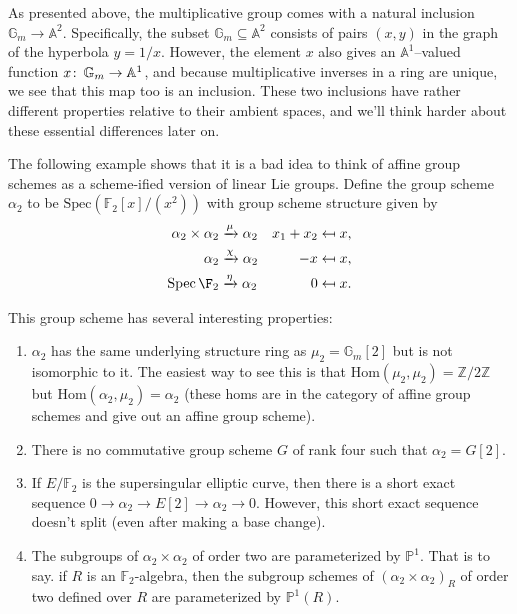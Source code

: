 \begin{remark}
As presented above, the multiplicative group comes with a natural inclusion $\mathbb G_m \to \mathbb A^2$.  Specifically, the subset $\mathbb G_m \subseteq \mathbb A^2$ consists of pairs $(x, y)$ in the graph of the hyperbola $y = 1/x$.  However, the element $x$ also gives an $\mathbb A^1$--valued function $x\colon\thinspace \mathbb G_m \to \mathbb A^1$, and because multiplicative inverses in a ring are unique, we see that this map too is an inclusion.  These two inclusions have rather different properties relative to their ambient spaces, and we'll think harder about these essential differences later on.
\end{remark}

\begin{example}\label{Alpha2Example}
The following example shows that it is a bad idea to think of affine group schemes as a scheme-ified version of linear Lie groups.  Define the group scheme $\alpha_2$ to be $\mathrm{Spec}(\mathbb{F}_2[x]/(x^2))$ with group scheme structure given by
\begin{align*}
\alpha_2 \times \alpha_2 &\xrightarrow{\mu} \alpha_2 & x_1 + x_2 & \mapsfrom x, \\
\alpha_2 & \xrightarrow{\chi} \alpha_2 & -x & \mapsfrom x, \\
\Spec \F_2 & \xrightarrow{\eta} \alpha_2 & 0 & \mapsfrom x.
\end{align*}

This group scheme has several interesting properties:
\begin{enumerate}
\item $\alpha_2$ has the same underlying structure ring as $\mu_2 = \mathbb{G}_m[2]$ but is not isomorphic to it.  The easiest way to see this is that $\mathrm{Hom}(\mu_2, \mu_2) = \mathbb{Z}/2\mathbb{Z}$ but $\mathrm{Hom}(\alpha_2, \mu_2) = \alpha_2$ (these homs are in the category of affine group schemes and give out an affine group scheme).  
\item There is no commutative group scheme $G$ of rank four such that $\alpha_2 = G[2]$.
\item If $E/\mathbb{F}_2$ is the supersingular elliptic curve, then there is a short exact sequence $0 \rightarrow \alpha_2 \rightarrow E[2] \rightarrow \alpha_2 \rightarrow 0$.  However, this short exact sequence doesn't split (even after making a base change).
\item The subgroups of $\alpha_2 \times \alpha_2$ of order two are parameterized by $\mathbb{P}^1$.  That is to say. if $R$ is an $\mathbb{F}_2$-algebra, then the subgroup schemes of $(\alpha_2 \times \alpha_2)_R$ of order two defined over $R$ are parameterized by $\mathbb{P}^1(R)$.
\end{enumerate}
\end{example}

